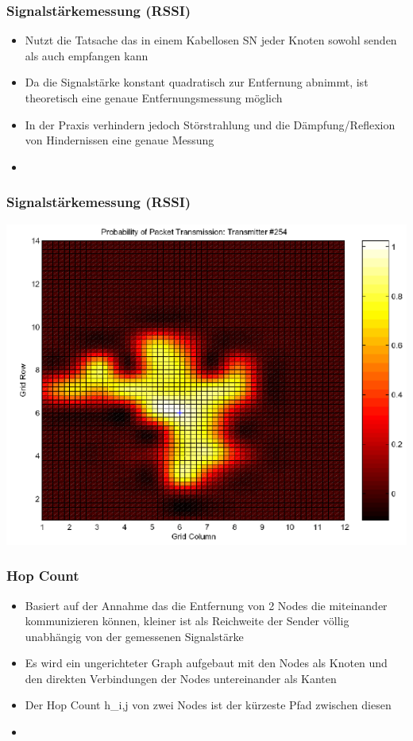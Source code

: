 \begin{frame}
\frametitle{Signalstärkemessung (RSSI)}

\begin{itemize}
  \item Nutzt die Tatsache das in einem Kabellosen SN jeder Knoten sowohl senden als auch empfangen kann
  \item Da die Signalstärke konstant quadratisch zur Entfernung abnimmt, ist theoretisch eine genaue Entfernungsmessung möglich
  \item In der Praxis verhindern jedoch Störstrahlung und die Dämpfung/Reflexion von Hindernissen eine genaue Messung
  \item 
\end{itemize}
\end{frame}

\begin{frame}
\frametitle{Signalstärkemessung (RSSI)}
  \begin{center}
  \includegraphics[scale=0.5]{img/RSSI1}

  \end{center}
\end{frame}

\begin{frame}
\frametitle{Hop Count}

\begin{itemize}
  \item Basiert auf der Annahme das die Entfernung von 2 Nodes die miteinander kommunizieren können, kleiner ist als Reichweite der Sender völlig unabhängig
    von der gemessenen Signalstärke
  \item Es wird ein ungerichteter Graph aufgebaut mit den Nodes als Knoten und den direkten Verbindungen der Nodes untereinander als Kanten
  \item Der Hop Count h_{i,j} von zwei Nodes ist der kürzeste Pfad zwischen diesen
  \item 
\end{itemize}
\end{frame}

